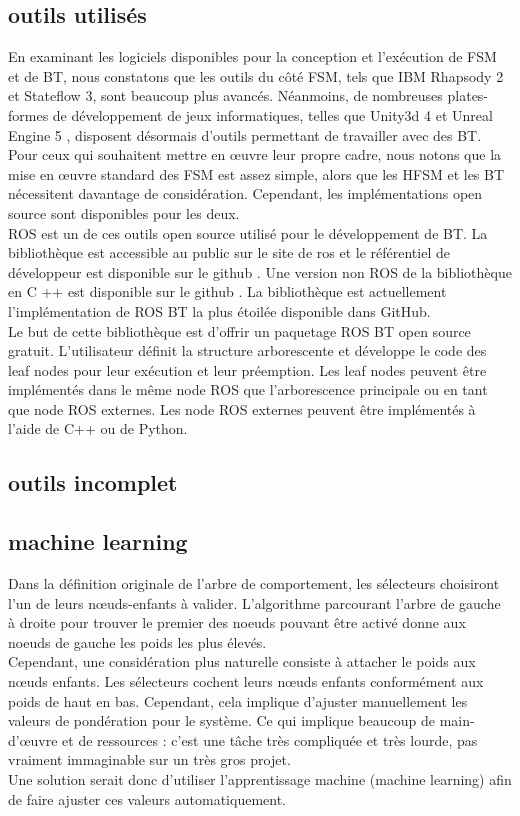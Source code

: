 \documentclass[titlepage]{article}
\begin{document}
		\subsection{outils utilisés}
			En examinant les logiciels disponibles pour la conception et l'exécution de FSM et de BT, nous constatons que les outils du côté FSM, tels que IBM Rhapsody 2 et Stateflow 3, sont beaucoup plus avancés. Néanmoins, de nombreuses plates-formes de développement de jeux informatiques, telles que Unity3d 4\cite{technologies} et Unreal Engine 5 \cite{unreal_engine}, disposent désormais d'outils permettant de travailler avec des BT. Pour ceux qui souhaitent mettre en œuvre leur propre cadre, nous notons que la mise en œuvre standard des FSM est assez simple, alors que les HFSM et les BT nécessitent davantage de considération. Cependant, les implémentations open source sont disponibles pour les deux.
			\\
			ROS est un de ces outils open source utilisé pour le développement de BT.
			La bibliothèque est accessible au public sur le site de ros \cite{ros.org} et le référentiel de développeur est disponible sur le github \cite{miccol_2018_dev}. Une version non ROS de la bibliothèque en C ++ est disponible sur le github \cite{miccol_2018}. La bibliothèque est actuellement l’implémentation de ROS BT la plus étoilée disponible dans GitHub.
			\\
			Le but de cette bibliothèque est d’offrir un paquetage ROS BT open source gratuit. L'utilisateur définit la structure arborescente et développe le code des leaf nodes pour leur exécution et leur préemption. Les leaf nodes peuvent être implémentés dans le même node ROS que l'arborescence principale ou en tant que node ROS externes. Les node ROS externes peuvent être implémentés à l'aide de C++ ou de Python.
		\subsection{outils incomplet}
		\subsection{machine learning}
		Dans la définition originale de l’arbre de comportement, les sélecteurs choisiront l’un de leurs nœuds-enfants à valider. L’algorithme parcourant l'arbre de gauche à droite pour trouver le premier des noeuds pouvant être activé donne aux noeuds de gauche les poids les plus élevés. \cite{Fu2016/08}
		\\
		Cependant, une considération plus naturelle consiste à attacher le poids aux nœuds enfants. Les sélecteurs cochent leurs nœuds enfants conformément aux poids de haut en bas. Cependant, cela implique d'ajuster manuellement les valeurs de pondération pour le système. Ce qui implique beaucoup de main-d'œuvre et de ressources : c'est une tâche très compliquée et très lourde, pas vraiment immaginable sur un très gros projet. \cite{Fu2016/08}
		\\
		Une solution serait donc d'utiliser l'apprentissage machine (machine learning) afin de faire ajuster ces valeurs automatiquement.
	\clearpage
\end{document}
